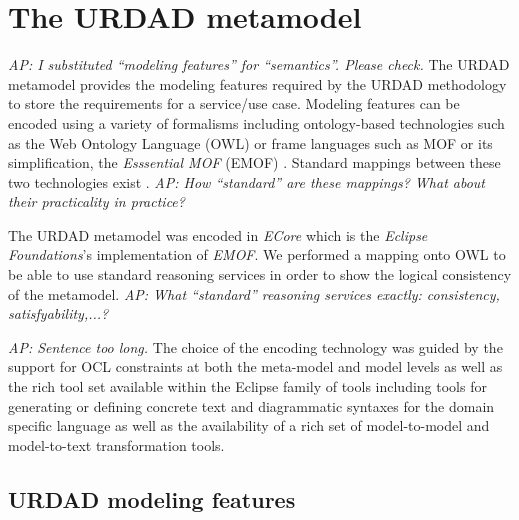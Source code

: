 \section{The URDAD metamodel \label{sec:metamodel}}

\emph{AP: I substituted ``modeling features'' for ``semantics''. Please check.} The URDAD metamodel provides the modeling features required by the URDAD methodology to store the requirements for a service/use case. Modeling features can be encoded using a variety of formalisms including ontology-based technologies such as the Web Ontology Language (OWL) \cite{} or frame languages such as MOF or its simplification, the {\em Esssential MOF} (EMOF) \cite{}. Standard mappings between these two technologies exist \cite{staab_model_2010}. \emph{AP: How ``standard'' are these mappings? What about their practicality in practice?}

The URDAD metamodel was encoded in {\em ECore} which is the {\em Eclipse Foundations}'s implementation of {\em EMOF}. We performed a mapping onto OWL to be able to use standard reasoning services in order to show the logical consistency of the metamodel. \emph{AP: What ``standard'' reasoning services exactly: consistency, satisfyability,...?}

\emph{AP: Sentence too long.} The choice of the encoding technology was guided by the support for OCL constraints at both the meta-model and model levels as well as the rich tool set available within the Eclipse family of tools including tools for generating or defining concrete text and diagrammatic syntaxes for the domain specific language as well as the availability of a rich set of model-to-model and model-to-text transformation tools.


\subsection{URDAD modeling features}

